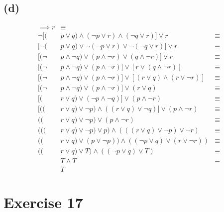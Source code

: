 \documentclass{article}
\begin{document}
\subsection{(d)}
\begin{align*}
	[(      & p \lor q) \land (p \implies r) \land (q \implies r)] \implies r                & \equiv \\
	\neg [( & p \lor q) \land (\neg p \lor r) \land (\neg q \lor r)] \lor r                  & \equiv \\
	[\neg ( & p \lor q) \lor \neg (\neg p \lor r) \lor \neg (\neg q \lor r)] \lor r          & \equiv \\
	[(\neg  & p \land \neg q) \lor (p \land \neg r) \lor (q \land \neg r)] \lor r            & \equiv \\
	[(\neg  & p \land \neg q) \lor (p \land \neg r)] \lor [r \lor (q \land \neg r)]          & \equiv \\
	[(\neg  & p \land \neg q) \lor (p \land \neg r)] \lor [(r \lor q) \land (r \lor \neg r)] & \equiv \\
	[(\neg  & p \land \neg q) \lor (p \land \neg r)] \lor (r \lor q)                         & \equiv \\
	[(      & r \lor q) \lor (\neg p \land \neg q)] \lor (p \land \neg r)                    & \equiv \\
	[((     & r \lor q) \lor \neg p) \land ((r \lor q) \lor \neg q)] \lor (p \land \neg r)   & \equiv \\
	((      & r \lor q) \lor \neg p) \lor (p \land \neg r)                                   & \equiv \\
	(((     & r \lor q) \lor \neg p) \lor p) \land (((r \lor q) \lor \neg p) \lor \neg r)    & \equiv \\
	((      & r \lor q) \lor (p \lor \neg p)) \land ((\neg p \lor q) \lor (r \lor \neg r))   & \equiv \\
	((      & r \lor q) \lor T) \land ((\neg p \lor q) \lor T)                               & \equiv \\
	        & T \land T                                                                      & \equiv \\
	        & T
\end{align*}

\pagebreak

\section{Exercise 17}
\end{document}
